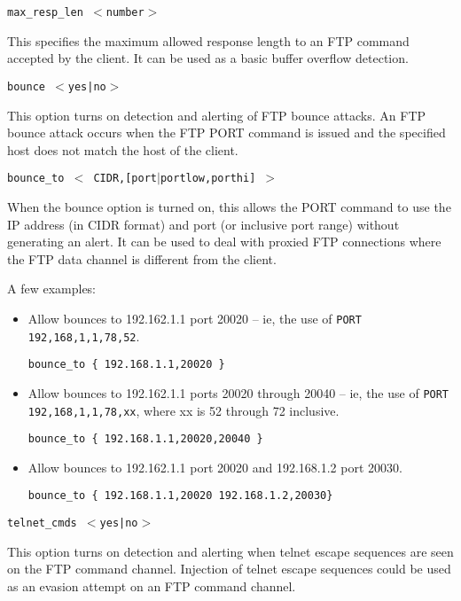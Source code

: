 \documentclass[english]{report}
\newcounter{slistnum}
\newenvironment{slist}
{ \begin{list}{ {\bf \arabic{slistnum}.} }{\usecounter{slistnum} } }
{ \end{list} }
\begin{document}
\begin{slist}
\item \texttt{max\_resp\_len $<$number$>$}

This specifies the maximum allowed response length to an FTP command
accepted by the client.  It can be used as a basic buffer overflow
detection.

\item \texttt{bounce $<$yes|no$>$}

This option turns on detection and alerting of FTP bounce attacks.
An FTP bounce attack occurs when the FTP PORT command is issued and the
specified host does not match the host of the client.

\item \texttt{bounce\_to $<$ CIDR,[port$|$portlow,porthi] $>$}

When the bounce option is turned on, this allows the PORT command to use
the IP address (in CIDR format) and port (or inclusive port range)
without generating an alert.  It can be used to deal with proxied
FTP connections where the FTP data channel is different from the client.

A few examples:

\begin{itemize}
\item Allow bounces to 192.162.1.1 port 20020 -- ie, the use of
\texttt{PORT 192,168,1,1,78,52}.

\begin{verbatim}
bounce_to { 192.168.1.1,20020 }
\end{verbatim}

\item Allow bounces to 192.162.1.1 ports 20020 through 20040 -- ie,
the use of \texttt{PORT 192,168,1,1,78,xx}, where xx is 52 through 72
inclusive.

\begin{verbatim}
bounce_to { 192.168.1.1,20020,20040 }
\end{verbatim}

\item Allow bounces to 192.162.1.1 port 20020 and 192.168.1.2 port 20030.

\begin{verbatim}
bounce_to { 192.168.1.1,20020 192.168.1.2,20030}
\end{verbatim}

\end{itemize}

\item \texttt{telnet\_cmds $<$yes|no$>$}

This option turns on detection and alerting when telnet escape sequences are
seen on the FTP command channel.  Injection of telnet escape sequences
could be used as an evasion attempt on an FTP command channel.

\end{slist}
\end{document}
